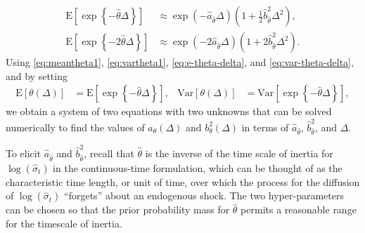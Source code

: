 \documentclass{beamer}
\newcommand{\hb}{\hat{b}}
\newcommand{\ha}{\hat{a}}
\newcommand{\htheta}{\hat{\theta}}
\newcommand{\hsigma}{\hat{\sigma}}
\newcommand{\E}[1]{\mbox{E}\left[#1\right]}
\newcommand{\Var}[1]{\mbox{Var}\left[#1\right]}
\newcommand{\expo}[1]{ \exp\left\{ #1 \right\}}
\begin{document}
\begin{frame}[allowframebreaks]
\begin{align}
\E{\expo{-\htheta \Delta}} &\approx \exp \left(-\ha_{\htheta} \Delta \right) \left( 1 + \frac{1}{2} \hb_{\htheta}^2 \Delta^2 \right) \label{eq:e-theta-delta}, \\
%
\E{\expo{-2\htheta \Delta}} &\approx \exp \left(-2\ha_{\htheta} \Delta \right) \left( 1 + 2 \hb_{\htheta}^2 \Delta^2 \right) \label{eq:var-theta-delta}.
\end{align}
Using \eqref{eq:meantheta1}, \eqref{eq:vartheta1}, \eqref{eq:e-theta-delta}, and \eqref{eq:var-theta-delta}, and by setting
\begin{align*}
  \E{\theta(\Delta)}  &= \E{\expo{-\htheta \Delta}},& \Var{\theta(\Delta)} &= \Var{\expo{-\htheta \Delta}},
\end{align*}
we obtain a system of two equations with two unknowns that can be solved numerically to find the values of $a_\theta(\Delta)$ and $b^2_\theta(\Delta)$ in terms of $\ha_{\htheta}$, $\hb^2_{\htheta}$, and $\Delta$.

To elicit $\ha_{\htheta}$ and $\hb^2_{\htheta}$, recall that $\hat{\theta}$ is the inverse of the time scale of inertia for $\log(\hsigma_t)$ in the continuous-time formulation, which can be thought of as the characteristic time length, or unit of time, over which the process for the diffusion of $\log(\hsigma_t)$ ``forgets'' about an endogenous shock. The two hyper-parameters can be chosen so that the prior probability mass for $\htheta$ permits a reasonable range for the timescale of inertia.
\end{frame}
\end{document}
